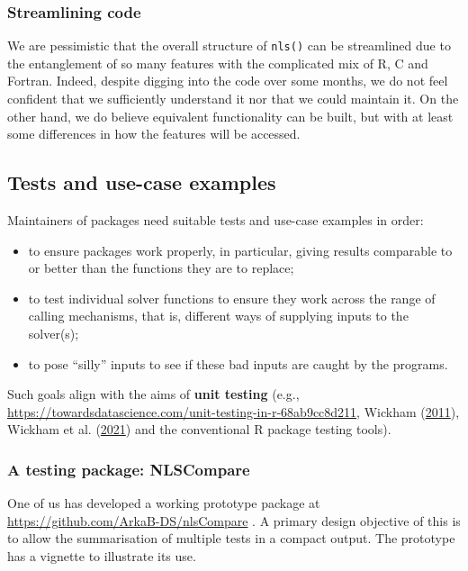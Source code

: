 \documentclass[
]{article}
\providecommand{\tightlist}{%
  \setlength{\itemsep}{0pt}\setlength{\parskip}{0pt}}
\begin{document}
\hypertarget{streamlining-code}{%
\subsubsection{Streamlining code}\label{streamlining-code}}

We are pessimistic that the overall structure of \texttt{nls()} can be
streamlined due to the entanglement of so many features with the
complicated mix of R, C and Fortran. Indeed, despite digging into the
code over some months, we do not feel confident that we sufficiently
understand it nor that we could maintain it. On the other hand, we do
believe equivalent functionality can be built, but with at least some
differences in how the features will be accessed.

\hypertarget{tests-and-use-case-examples}{%
\subsection{Tests and use-case
examples}\label{tests-and-use-case-examples}}

Maintainers of packages need suitable tests and use-case examples in
order:

\begin{itemize}
\tightlist
\item
  to ensure packages work properly, in particular, giving results
  comparable to or better than the functions they are to replace;
\item
  to test individual solver functions to ensure they work across the
  range of calling mechanisms, that is, different ways of supplying
  inputs to the solver(s);
\item
  to pose ``silly'' inputs to see if these bad inputs are caught by the
  programs.
\end{itemize}

Such goals align with the aims of \textbf{unit testing} (e.g.,
\url{https://towardsdatascience.com/unit-testing-in-r-68ab9cc8d211},
Wickham (\protect\hyperlink{ref-HWtestthat11}{2011}), Wickham et al.
(\protect\hyperlink{ref-HWdevtools21}{2021}) and the conventional R
package testing tools).

\hypertarget{a-testing-package-nlscompare}{%
\subsubsection{A testing package:
NLSCompare}\label{a-testing-package-nlscompare}}

One of us has developed a working prototype package at
\url{https://github.com/ArkaB-DS/nlsCompare} . A primary design
objective of this is to allow the summarisation of multiple tests in a
compact output. The prototype has a vignette to illustrate its use.
\end{document}
